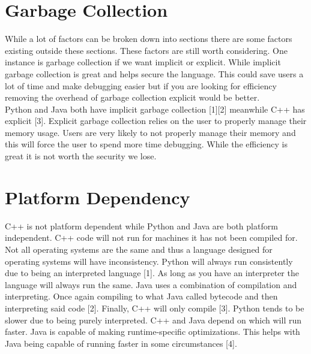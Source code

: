 \documentclass[sigconf, nonacm, authorversion, language=english, 12pt]{acmart}
\def\tab{\hspace*{5mm}}
\begin{document}
\section{Garbage Collection}

\tab While a lot of factors can be broken down into sections there are some factors existing outside these sections. These
factors are still worth considering. One instance is garbage collection if we want implicit or explicit. While implicit
garbage collection is great and helps secure the language. This could save users a lot of time and make debugging easier
but if you are looking for efficiency removing the overhead of garbage collection explicit would be better.\\

\tab Python and Java both have implicit garbage collection [1][2] meanwhile C++ has explicit [3]. Explicit garbage collection relies on
the user to properly manage their memory usage. Users are very likely to not properly manage their memory and this will
force the user to spend more time debugging. While the efficiency is great it is not worth the security we lose.\\

\section{Platform Dependency}
\tab C++ is not platform dependent while Python and Java are both platform independent. C++ code will not run for machines it has not been compiled for. Not all operating systems are the same
and thus a language designed for operating systems will have inconsistency. Python will always run consistently due to being an interpreted language [1]. As long as you have an interpreter
the language will always run the same. Java uses a combination of compilation and interpreting. Once again compiling to what Java called bytecode and then interpreting said code [2]. Finally, C++
will only compile [3]. Python tends to be slower due to being purely interpreted. C++ and Java depend on which will run faster. Java is capable of making runtime-specific optimizations.
This helps with Java being capable of running faster in some circumstances [4].\\
\end{document}
